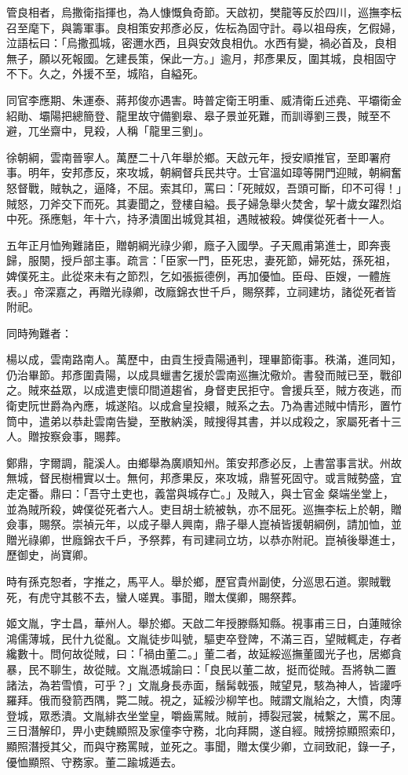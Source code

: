 \begin{pinyinscope}
管良相者，烏撒衛指揮也，為人慷慨負奇節。天啟初，樊龍等反於四川，巡撫李枟召至麾下，與籌軍事。良相策安邦彥必反，佐枟為固守計。尋以祖母疾，乞假婦，泣語枟曰：「烏撒孤城，密邇水西，且與安效良相仇。水西有變，禍必首及，良相無子，願以死報國。乞建長策，保此一方。」逾月，邦彥果反，圍其城，良相固守不下。久之，外援不至，城陷，自縊死。

同官李應期、朱運泰、蔣邦俊亦遇害。時普定衛王明重、威清衛丘述堯、平壩衛金紹勛、壩陽把總簡登、龍里故守備劉皋、皋子景並死難，而訓導劉三畏，賊至不避，兀坐齋中，見殺，人稱「龍里三劉」。

徐朝綱，雲南晉寧人。萬歷二十八年舉於鄉。天啟元年，授安順推官，至即署府事。明年，安邦彥反，來攻城，朝綱督兵民共守。士官溫如璋等開門迎賊，朝綱奮怒督戰，賊執之，逼降，不屈。索其印，罵曰：「死賊奴，吾頭可斷，印不可得！」賊怒，刀斧交下而死。其妻聞之，登樓自縊。長子婦急舉火焚舍，挈十歲女躍烈焰中死。孫應魁，年十六，持矛潰圍出城覓其祖，遇賊被殺。婢僕從死者十一人。

五年正月恤殉難諸臣，贈朝綱光祿少卿，廕子入國學。子天鳳甫第進士，即奔喪歸，服闋，授戶部主事。疏言：「臣家一門，臣死忠，妻死節，婦死姑，孫死祖，婢僕死主。此從來未有之節烈，乞如張振德例，再加優恤。臣母、臣嫂，一體旌表。」帝深嘉之，再贈光祿卿，改廕錦衣世千戶，賜祭葬，立祠建坊，諸從死者皆附祀。

同時殉難者：

楊以成，雲南路南人。萬歷中，由貢生授貴陽通判，理畢節衛事。秩滿，進同知，仍治畢節。邦彥圍貴陽，以成具蠟書乞援於雲南巡撫沈儆炌。書發而賊已至，戰卻之。賊來益眾，以成遣吏懷印間道趨省，身督吏民拒守。會援兵至，賊方夜逃，而衛吏阮世爵為內應，城遂陷。以成倉皇投繯，賊系之去。乃為書述賊中情形，置竹筒中，遣弟以恭赴雲南告變，至散納溪，賊搜得其書，并以成殺之，家屬死者十三人。贈按察僉事，賜葬。

鄭鼎，字爾調，龍溪人。由鄉舉為廣順知州。策安邦彥必反，上書當事言狀。州故無城，督民樹柵實以士。無何，邦彥果反，來攻城，鼎誓死固守。或言賊勢盛，宜走定番。鼎曰：「吾守土吏也，義當與城存亡。」及賊入，與士官金粲端坐堂上，並為賊所殺，婢僕從死者六人。吏目胡士統被執，亦不屈死。巡撫李枟上於朝，贈僉事，賜祭。崇禎元年，以成子舉人興南，鼎子舉人崑禎皆援朝綱例，請加恤，並贈光祿卿，世廕錦衣千戶，予祭葬，有司建祠立坊，以恭亦附祀。崑禎後舉進士，歷御史，尚寶卿。

時有孫克恕者，字推之，馬平人。舉於鄉，歷官貴州副使，分巡思石道。禦賊戰死，有虎守其骸不去，蠻人嗟異。事聞，贈太僕卿，賜祭葬。

姬文胤，字士昌，華州人。舉於鄉。天啟二年授滕縣知縣。視事甫三日，白蓮賊徐鴻儒薄城，民什九從亂。文胤徒步叫號，驅吏卒登陴，不滿三百，望賊輒走，存者纔數十。問何故從賊，曰：「禍由董二。」董二者，故延綏巡撫董國光子也，居鄉貪暴，民不聊生，故從賊。文胤憑城諭曰：「良民以董二故，挺而從賊。吾將執二置諸法，為若雪憤，可乎？」文胤身長赤面，鬚髯戟張，賊望見，駭為神人，皆讙呼羅拜。俄而發箭西隅，斃二賊。視之，延綏沙柳竿也。賊謂文胤紿之，大憤，肉薄登城，眾悉潰。文胤緋衣坐堂皇，嚼齒罵賊。賊前，搏裂冠裳，械繫之，罵不屈。三日潛解印，畀小吏魏顯照及家僮李守務，北向拜闕，遂自經。賊搒掠顯照索印，顯照潛授其父，而與守務罵賊，並死之。事聞，贈太僕少卿，立祠致祀，錄一子，優恤顯照、守務家。董二踰城遁去。


\end{pinyinscope}
